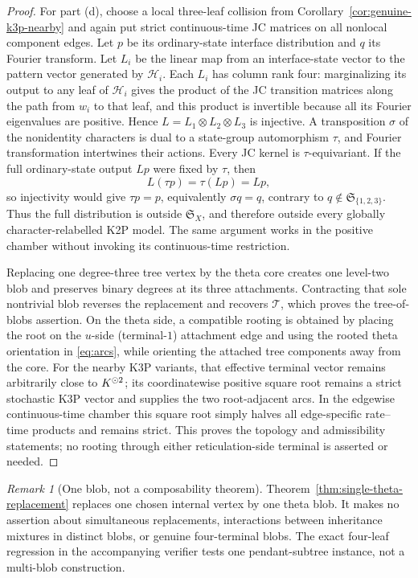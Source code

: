\documentclass[11pt]{article}
\theoremstyle{remark}\newtheorem{remark}[theorem]{Remark}
\begin{document}
\begin{proof}
For part (d), choose a local three-leaf collision from Corollary~\ref{cor:genuine-k3p-nearby} and again put strict continuous-time JC matrices on all nonlocal component edges. Let $p$ be its ordinary-state interface distribution and $q$ its Fourier transform. Let $L_i$ be the linear map from an interface-state vector to the pattern vector generated by $\mathcal H_i$. Each $L_i$ has column rank four: marginalizing its output to any leaf of $\mathcal H_i$ gives the product of the JC transition matrices along the path from $w_i$ to that leaf, and this product is invertible because all its Fourier eigenvalues are positive. Hence $L=L_1\otimes L_2\otimes L_3$ is injective. A transposition $\sigma$ of the nonidentity characters is dual to a state-group automorphism $\tau$, and Fourier transformation intertwines their actions. Every JC kernel is $\tau$-equivariant. If the full ordinary-state output $Lp$ were fixed by $\tau$, then
\[
L(\tau p)=\tau(Lp)=Lp,
\]
so injectivity would give $\tau p=p$, equivalently $\sigma q=q$, contrary to $q\notin\mathfrak S_{\{1,2,3\}}$. Thus the full distribution is outside $\mathfrak S_X$, and therefore outside every globally character-relabelled K2P model. The same argument works in the positive chamber without invoking its continuous-time restriction.

Replacing one degree-three tree vertex by the theta core creates one level-two blob and preserves binary degrees at its three attachments. Contracting that sole nontrivial blob reverses the replacement and recovers $\mathcal T$, which proves the tree-of-blobs assertion. On the theta side, a compatible rooting is obtained by placing the root on the $u$-side (terminal-$1$) attachment edge and using the rooted theta orientation in \eqref{eq:arcs}, while orienting the attached tree components away from the core. For the nearby K3P variants, that effective terminal vector remains arbitrarily close to $K^{\mathbin{\odot}2}$; its coordinatewise positive square root remains a strict stochastic K3P vector and supplies the two root-adjacent arcs. In the edgewise continuous-time chamber this square root simply halves all edge-specific rate--time products and remains strict. This proves the topology and admissibility statements; no rooting through either reticulation-side terminal is asserted or needed.
\end{proof}

\begin{remark}[One blob, not a composability theorem]\label{rem:no-multiblob}
Theorem~\ref{thm:single-theta-replacement} replaces one chosen internal vertex by one theta blob. It makes no assertion about simultaneous replacements, interactions between inheritance mixtures in distinct blobs, or genuine four-terminal blobs. The exact four-leaf regression in the accompanying verifier tests one pendant-subtree instance, not a multi-blob construction.
\end{remark}
\end{document}
